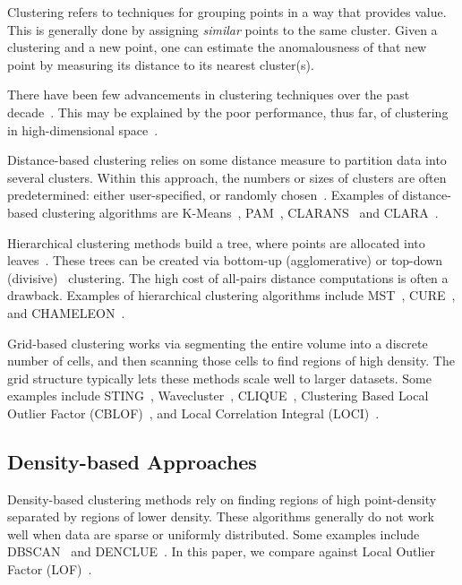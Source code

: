 Clustering refers to techniques for grouping points in a way that provides value.
This is generally done by assigning \textit{similar} points to the same cluster.
Given a clustering and a new point, one can estimate the anomalousness of that new point by measuring its distance to its nearest cluster(s).

There have been few advancements in clustering techniques over the past decade~\cite{wang2019progress}.
This may be explained by the poor performance, thus far, of clustering in high-dimensional space~\cite{zhang2013advancements}.

Distance-based clustering relies on some distance measure to partition data into several clusters.
Within this approach, the numbers or sizes of clusters are often predetermined: either user-specified, or randomly chosen~\cite{wang2019progress}.
Examples of distance-based clustering algorithms are
K-Means~\cite{macqueen1967some},
PAM~\cite{kaufman2009finding},
CLARANS~\cite{ng1994efficient} and
CLARA~\cite{kaufman2009finding}.

Hierarchical clustering methods build a tree, where points are allocated into leaves~\cite{wang2019progress}.
These trees can be created via bottom-up (agglomerative) or top-down (divisive)~\cite{agrawal1998automatic} clustering.
The high cost of all-pairs distance computations is often a drawback.
Examples of hierarchical clustering algorithms include
MST~\cite{zahn1971graph},
CURE~\cite{guha1998cure}, and
CHAMELEON~\cite{karypis1999hierarchical}.

Grid-based clustering works via segmenting the entire volume into a discrete number of cells, and then scanning those cells to find regions of high density.
The grid structure typically lets these methods scale well to larger datasets.
Some examples include
STING~\cite{wang1997sting},
Wavecluster~\cite{sheikholeslami2000wavecluster},
CLIQUE~\cite{agrawal1998automatic},
Clustering Based Local Outlier Factor (CBLOF)~\cite{he2003cblof}, and
Local Correlation Integral (LOCI)~\cite{papadimitriou2003loci}.


\subsection{Density-based Approaches}
\label{subsec:introduction:density-based-approaches}

Density-based clustering methods rely on finding regions of high point-density separated by regions of lower density.
These algorithms generally do not work well when data are sparse or uniformly distributed.
Some examples include
DBSCAN~\cite{ester1996density} and
DENCLUE~\cite{hinneburg1998efficient}.
In this paper, we compare against Local Outlier Factor (LOF)~\cite{breunig2000lof}.


